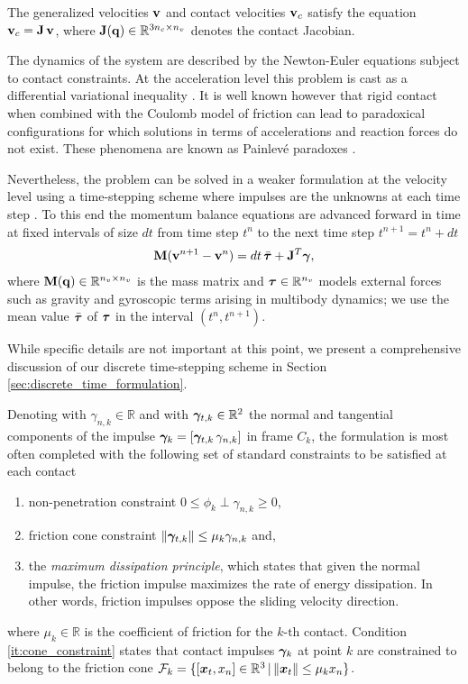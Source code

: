 The generalized velocities ${\mathbf{v}}$ and contact velocities ${\mathbf{v}}_c$ satisfy
the equation ${\mathbf{v}}_c={\mathbf{J}}\,{\mathbf{v}}$, where
${\mathbf{J}}({\mathbf{q}})\in\mathbb{R}^{3n_c\times n_v}$ denotes the contact Jacobian.

The dynamics of the system are described by the Newton-Euler equations subject
to contact constraints. At the acceleration level this problem is cast as a
differential variational inequality \cite{bib:pang2008differential}. It is well
known however \cite{bib:baraff1993issues} that rigid contact when combined with
the Coulomb model of friction can lead to paradoxical configurations for which
solutions in terms of accelerations and reaction forces do not exist. These
phenomena are known as Painlev\'e paradoxes \cite{bib:hogan2017regularization}.

Nevertheless, the problem can be solved in a weaker formulation at the velocity
level using a time-stepping scheme where impulses are the unknowns at each time
step \cite{bib:stewart1998convergence}. To this end the momentum balance
equations are advanced forward in time at fixed intervals of size $dt$ from time
step $t^n$ to the next time step $t^{n+1}=t^n+dt$
\begin{eqnarray}
	\mf{M}(\mf{v}^{n+1}-\mf{v}^n)  = dt\,\bar{\vf{\tau}} + \mf{J}^T\mf{\bgamma},
	\label{eq:momentum_balance}
\end{eqnarray}
where ${\mathbf{M}}({\mathbf{q}})\in\mathbb{R}^{n_v\times n_v}$ is the mass matrix and
${\bm{\tau}}\in\mathbb{R}^{n_v}$ models external forces such as gravity and
gyroscopic terms arising in multibody dynamics; we use the mean value
$\bar{{\bm{\tau}}}$ of ${{\bm{\tau}}}$ in the interval $(t^n,t^{n+1})$.

While specific details are not important at this point, we present a
comprehensive discussion of our discrete time-stepping scheme in Section
\ref{sec:discrete_time_formulation}.

Denoting with $\gamma_{n,k} \in \mathbb{R}$ and with ${\bm\gamma}_{t,k} \in
\mathbb{R}^2$ the normal and tangential components of the impulse
${\bm\gamma}_k=[{\bm\gamma}_{t,k}\,\gamma_{n,k}]$ in frame $C_k$, the formulation is
most often completed with the following set of standard constraints to be
satisfied at each contact
\begin{enumerate}
	\item non-penetration constraint $0\le\phi_k\perp\gamma_{n,k}\ge0$,
	\item\label{it:cone_constraint} friction cone constraint
	$\Vert{\bm\gamma}_{t,k}\Vert\le \mu_k\gamma_{n,k}$ and,
	\item the \emph{maximum dissipation principle}, which states that given the
	normal impulse, the friction impulse maximizes the rate of energy
	dissipation. In other words, friction impulses oppose the sliding velocity
	direction.
\end{enumerate}
where $\mu_k \in \mathbb{R}$ is the coefficient of friction for the
$k\text{-th}$ contact. Condition \ref{it:cone_constraint} states that contact
impulses ${\bm\gamma}_k$ at point $k$ are constrained to belong to the friction cone
$\mathcal{F}_k=\{[{\bm{x}}_t, x_n] \in\mathbb{R}^3 \,|\, \Vert{\bm{x}}_t\Vert\le
\mu_k x_n\}$.

